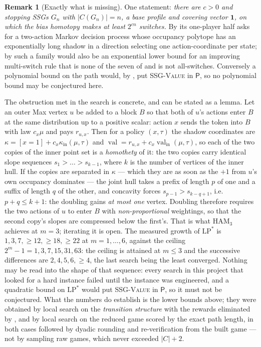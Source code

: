 \documentclass[11pt]{article}
\theoremstyle{plain}
\theoremstyle{definition}
\newtheorem{remark}[theorem]{Remark}
\DeclareMathOperator{\val}{val}
\newcommand{\bbone}{\mathbf{1}}
\begin{document}
\begin{remark}[Exactly what is missing]\label{rem:bias-gap}
One statement: \emph{there are $c>0$ and stopping SSGs $G_n$ with
$|C(G_n)|=n$, a base profile and covering vector $\bbone$, on which the bias
homotopy makes at least $2^{cn}$ switches.} By  its
one-player half asks for a two-action Markov decision process whose occupancy
polytope has an exponentially long shadow in a direction selecting one
action-coordinate per state; by  such a family would
also be an exponential lower bound for an improving multi-switch rule that is
none of the seven of  and is not all-switches.
Conversely a polynomial bound on the path would, by
, put \textsc{SSG-Value} in $\mathsf P$, so no
polynomial bound may be conjectured here.

The obstruction met in the search is concrete, and can be stated as a lemma.
Let an outer Max vertex $u$ be added to a block $B$ so that both of $u$'s
actions enter $B$ at the same distribution up to a positive scalar: action $x$
sends the token into $B$ with law $c_x\mu$ and pays $r_{u,x}$. Then for a
policy $(x,\tau)$ the shadow coordinates are
$\kappa=[x{=}1]+c_x\kappa_{\mathrm{in}}(\mu,\tau)$ and
$\val=r_{u,x}+c_x\val_{\mathrm{in}}(\mu,\tau)$, so each of the two copies of
the inner point set is a \emph{homothety} of it: the two copies carry
identical slope sequences $s_1>\dots>s_{k-1}$, where $k$ is the number of
vertices of the inner hull. If the copies are separated in $\kappa$ --- which
they are as soon as the $+1$ from $u$'s own occupancy dominates --- the joint
hull takes a prefix of length $p$ of one and a suffix of length $q$ of the
other, and concavity forces $s_{p-1}>s_{k-q+1}$, i.e.\ $p+q\le k+1$: the
doubling gains \emph{at most one} vertex. Doubling therefore requires the two
actions of $u$ to enter $B$ with \emph{non-proportional} weightings, so that
the second copy's slopes are compressed below the first's. That is what
$\mathrm{HAM}_3$ achieves at $m=3$; iterating it is open.
The measured growth of $\mathrm{LP}^{\ast}$ is
$1,3,7,\ge12,\ge18,\ge22$ at $m=1,\dots,6$, against the ceiling
$2^{m}-1=1,3,7,15,31,63$: the ceiling is attained at $m\le3$ and the
successive differences are $2,4,5,6,\ge4$, the last search being the least
converged. Nothing may be read into the shape of that sequence:
every search in this project that looked for a hard instance failed until the
instance was engineered, and a quadratic bound on $\mathrm{LP}^{\ast}$ would
put \textsc{SSG-Value} in $\mathsf P$, so it must not be conjectured. What the
numbers do establish is the lower bounds above; they were obtained by local
search on the \emph{transition structure} with the rewards eliminated by
, and by local search on the reduced game scored by the
exact path length, in both cases followed by dyadic rounding and
re-verification from the built game --- not by sampling raw games, which never
exceeded $|C|+2$.
\end{remark}
\end{document}
